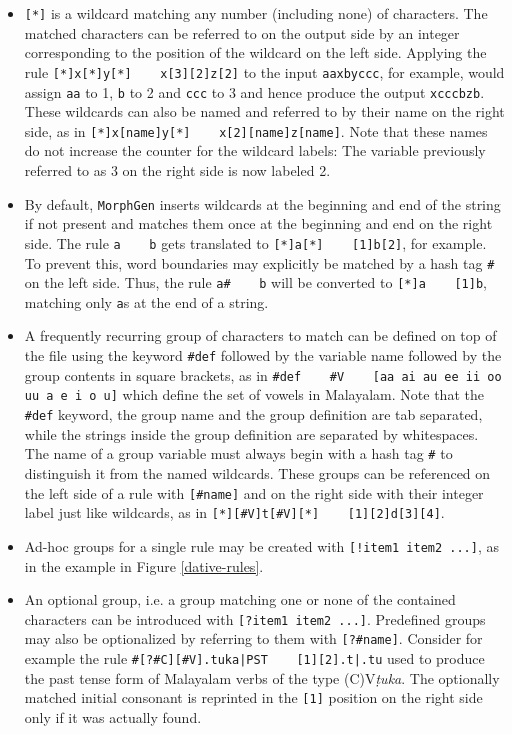 \documentclass[a4paper]{article}
\newcommand{\tab}{~~~}
\newcommand{\typ}[1]{\texttt{#1}}
\begin{document}
\begin{itemize}
\item{} \typ{[*]} is a wildcard matching any number (including none) of characters. The matched characters can be referred to on the output side by an integer corresponding to the position of the wildcard on the left side. Applying the rule \typ{[*]x[*]y[*] \tab x[3][2]z[2]} to the input \typ{aaxbyccc}, for example, would assign \typ{aa} to 1, \typ{b} to 2 and \typ{ccc} to 3 and hence produce the output \typ{xcccbzb}. These wildcards can also be named and referred to by their name on the right side, as in \typ{[*]x[name]y[*] \tab x[2][name]z[name]}. Note that these names do not increase the counter for the wildcard labels: The variable previously referred to as 3 on the right side is now labeled 2.
\item By default, \typ{MorphGen} inserts wildcards at the beginning and end of the string if not present and matches them once at the beginning and end on the right side. The rule \typ{a \tab b} gets translated to \typ{[*]a[*] \tab [1]b[2]}, for example. To prevent this, word boundaries may explicitly be matched by a hash tag \typ{\#} on the left side. Thus, the rule \typ{a\# \tab b} will be converted to \typ{[*]a \tab [1]b}, matching only \typ{a}s at the end of a string.
\item A frequently recurring group of characters to match can be defined on top of the file using the keyword \typ{\#def} followed by the variable name followed by the group contents in square brackets, as in \typ{\#def \tab \#V \tab [aa ai au ee ii oo uu a e i o u]} which define the set of vowels in Malayalam. Note that the \typ{\#def} keyword, the group name and the group definition are tab separated, while the strings inside the group definition are separated by whitespaces. The name of a group variable must always begin with a hash tag \typ{\#} to distinguish it from the named wildcards. These groups can be referenced on the left side of a rule with \typ{[\#name]} and on the right side with their integer label just like wildcards, as in \typ{[*][\#V]t[\#V][*] \tab [1][2]d[3][4]}.
\item Ad-hoc groups for a single rule may be created with \typ{[!item1 item2 ...]}, as in the example in Figure \ref{dative-rules}.
\item An optional group, i.e. a group matching one or none of the contained characters can be introduced with \typ{[?item1 item2 ...]}. Predefined groups may also be optionalized by referring to them with \typ{[?\#name]}. Consider for example the rule \typ{\#[?\#C][\#V].tuka|PST \tab [1][2].t|.tu} used to produce the past tense form of Malayalam verbs of the type (C)V\textit{ṭuka}. The optionally matched initial consonant is reprinted in the \typ{[1]} position on the right side only if it was actually found.

\end{itemize}
\end{document}
